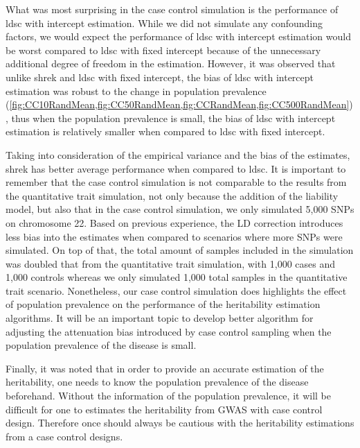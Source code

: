 	What was most surprising in the case control simulation is the performance of \gls{ldsc} with intercept estimation.
	While we did not simulate any confounding factors, we would expect the performance of \gls{ldsc} with intercept estimation would be worst compared to \gls{ldsc} with fixed intercept because of the unnecessary additional degree of freedom in the estimation. 
	However, it was observed that unlike \gls{shrek} and \gls{ldsc} with fixed intercept, the bias of \gls{ldsc} with intercept estimation was robust to the change in population prevalence (\cref{fig:CC10RandMean,fig:CC50RandMean,fig:CCRandMean,fig:CC500RandMean}), thus when the population prevalence is small, the bias of \gls{ldsc} with intercept estimation is relatively smaller when compared to \gls{ldsc} with fixed intercept.

	Taking into consideration of the empirical variance and the bias of the estimates, \gls{shrek} has better average performance when compared to \gls{ldsc}. 
	It is important to remember that the case control simulation is not comparable to the results from the quantitative trait simulation, not only because the addition of the liability model, but also that in the case control simulation, we only simulated 5,000 \glspl{SNP} on chromosome 22.
	Based on previous experience, the \gls{LD} correction introduces less bias into the estimates when compared to scenarios where more \glspl{SNP} were simulated. 
	On top of that, the total amount of samples included in the simulation was doubled that from the quantitative trait simulation, with 1,000 cases and 1,000 controls whereas we only simulated 1,000 total samples in the quantitative trait scenario. 
	Nonetheless, our case control simulation does highlights the effect of population prevalence on the performance of the heritability estimation algorithms.
	It will be an important topic to develop better algorithm for adjusting the attenuation bias introduced by case control sampling when the population prevalence of the disease is small.
	
	
	Finally, it was noted that in order to provide an accurate estimation of the heritability, one needs to know the population prevalence of the disease beforehand. 
	Without the information of the population prevalence, it will be difficult for one to estimates the heritability from \gls{GWAS} with case control design. 
	Therefore once should always be cautious with the heritability estimations from a case control designs.
	
